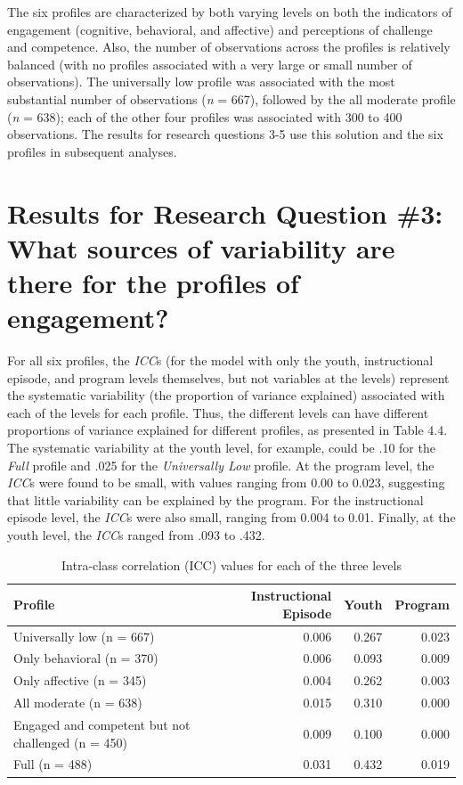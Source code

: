 \documentclass[]{msu-thesis}
\theoremstyle{definition}
\theoremstyle{definition}
\theoremstyle{definition}
\theoremstyle{remark}
\begin{document}
The six profiles are characterized by both varying levels on both the
indicators of engagement (cognitive, behavioral, and affective) and
perceptions of challenge and competence. Also, the number of
observations across the profiles is relatively balanced (with no
profiles associated with a very large or small number of observations).
The universally low profile was associated with the most substantial
number of observations (\emph{n} = 667), followed by the all moderate
profile (\emph{n} = 638); each of the other four profiles was associated
with 300 to 400 observations. The results for research questions 3-5 use
this solution and the six profiles in subsequent analyses.

\section{Results for Research Question \#3: What sources of variability
are there for the profiles of
engagement?}\label{results-for-research-question-3-what-sources-of-variability-are-there-for-the-profiles-of-engagement}

For all six profiles, the \emph{ICC}s (for the model with only the
youth, instructional episode, and program levels themselves, but not
variables at the levels) represent the systematic variability (the
proportion of variance explained) associated with each of the levels for
each profile. Thus, the different levels can have different proportions
of variance explained for different profiles, as presented in Table 4.4.
The systematic variability at the youth level, for example, could be .10
for the \emph{Full} profile and .025 for the \emph{Universally Low}
profile. At the program level, the \emph{ICC}s were found to be small,
with values ranging from 0.00 to 0.023, suggesting that little
variability can be explained by the program. For the instructional
episode level, the \emph{ICC}s were also small, ranging from 0.004 to
0.01. Finally, at the youth level, the \emph{ICC}s ranged from .093 to
.432.

\begin{table}

\caption{\label{tab:unnamed-chunk-13}Intra-class correlation (ICC) values for each of the three levels}
\centering
\begin{tabular}[t]{lrrr}
\toprule
Profile & Instructional Episode & Youth & Program\\
\midrule
Universally low (n = 667) & 0.006 & 0.267 & 0.023\\
Only behavioral (n = 370) & 0.006 & 0.093 & 0.009\\
Only affective (n = 345) & 0.004 & 0.262 & 0.003\\
All moderate (n = 638) & 0.015 & 0.310 & 0.000\\
Engaged and competent but not challenged (n = 450) & 0.009 & 0.100 & 0.000\\
Full (n = 488) & 0.031 & 0.432 & 0.019\\
\bottomrule
\end{tabular}
\end{table}
\end{document}
